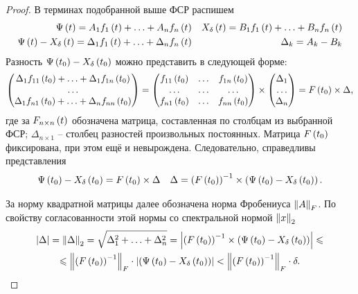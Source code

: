 \documentclass[a5paper,10pt]{article}
\begin{document}
\begin{proof}
В терминах подобранной выше ФСР распишем
\begin{align*}
\Psi\left(t\right) = A_{1} f_{1}\left(t\right) + \ldots + A_{n} f_{n}\left(t\right) 
&& X_{\delta}\left(t\right) = B_{1} f_{1}\left(t\right) + \ldots + B_{n} f_{n}\left(t\right) \\
\Psi\left(t\right) - X_{\delta}\left(t\right) = \Delta_{1} f_{1}\left(t\right) + \ldots + \Delta_{n} f_{n}\left(t\right) 
&& \Delta_{k} = A_{k} - B_{k}
\end{align*}
Разность $\Psi\left(t_{0}\right) - X_{\delta}\left(t_{0}\right)$ можно представить в следующей форме:
$$
\begin{pmatrix}
\Delta_{1} f_{11}\left(t_{0}\right) + \ldots + \Delta_{1} f_{1n}\left(t_{0}\right) \\
\ldots \\
\Delta_{1} f_{n1}\left(t_{0}\right) + \ldots + \Delta_{n} f_{nn}\left(t_{0}\right) 
\end{pmatrix}
= 
\begin{pmatrix}
f_{11}\left(t_{0}\right) & \ldots & f_{1n}\left(t_{0}\right) \\
\ldots & \ldots & \ldots \\
f_{n1}\left(t_{0}\right) & \ldots & f_{nn}\left(t_{0}\right) \\
\end{pmatrix}
\times
\begin{pmatrix}
\Delta_{1} \\ \ldots \\ \Delta_{n}
\end{pmatrix}
= F\left(t_{0}\right) \times \Delta,
$$
где за $F_{n \times n}\left(t\right)$ обозначена матрица, составленная по столбцам из выбранной ФСР; $\Delta_{n \times 1}$ -- столбец разностей произвольных постоянных.  Матрица $F\left(t_{0}\right)$ фиксирована, при этом ещё и невырождена. Следовательно, справедливы представления
\begin{align*}
\Psi\left(t_{0}\right) - X_{\delta}\left(t_{0}\right) = F\left(t_{0}\right) \times \Delta 
&& \Delta = \left(F\left(t_{0}\right)\right)^{-1} \times \left(\Psi\left(t_{0}\right) - X_{\delta}\left(t_{0}\right)\right).
\end{align*}

За норму квадратной матрицы далее обозначена норма Фробениуса $\left\lVert A\right\rVert_{F}$. По свойству согласованности этой нормы со спектральной нормой $\left\lVert x\right\rVert_{2}$
\begin{multline*}
\left|\Delta\right| = \left\lVert\Delta\right\rVert_{2}
= \sqrt{\Delta_{1}^2 + \ldots + \Delta_{n}^2}
= \left|\left(F\left(t_{0}\right)\right)^{-1} \times \left(\Psi\left(t_{0}\right) - X_{\delta}\left(t_{0}\right)\right)\right| \leqslant 
\\ \leqslant \left\lVert\left(F\left(t_{0}\right)\right)^{-1}\right\rVert_{F} \cdot \left|\left(\Psi\left(t_{0}\right) - X_{\delta}\left(t_{0}\right)\right)\right|
< \left\lVert\left(F\left(t_{0}\right)\right)^{-1}\right\rVert_{F} \cdot \delta.
\end{multline*}


\end{proof}
\end{document}
